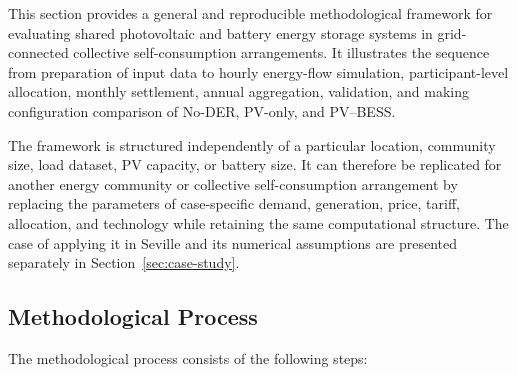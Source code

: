 
This section provides a general and reproducible methodological framework for evaluating shared photovoltaic and battery energy storage systems in grid-connected collective self-consumption arrangements. It illustrates the sequence from preparation of input data to hourly energy-flow simulation, participant-level allocation, monthly settlement, annual aggregation, validation, and making configuration comparison of No-DER, PV-only, and PV--BESS.

The framework is structured independently of a particular location, community size, load dataset, PV capacity, or battery size. It can therefore be replicated for another energy community or collective self-consumption arrangement by replacing the parameters of case-specific demand, generation, price, tariff, allocation, and technology while retaining the same computational structure. The case of applying it in Seville and its numerical assumptions are presented separately in Section~\ref{sec:case-study}.

\subsection{Methodological Process}
\label{sec:overall_methodological_process}

The methodological process consists of the following steps:

